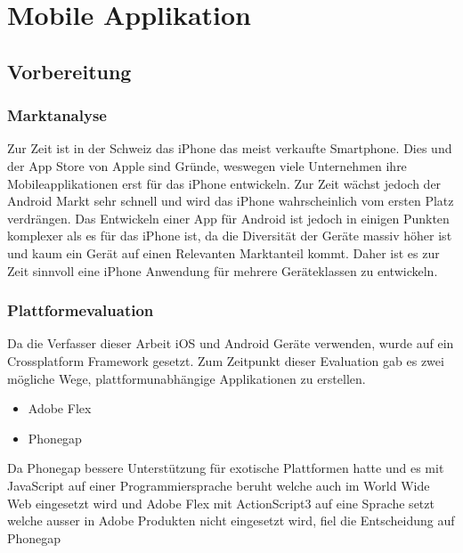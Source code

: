 
\newpage
\section{Mobile Applikation} %
\label{sec:Mobile Applikation}

\subsection{Vorbereitung} %
\label{sub:Vorbereitung}
\subsubsection{Marktanalyse} %
\label{ssub:Marktanalyse}
Zur Zeit ist in der Schweiz das iPhone das meist verkaufte Smartphone. Dies und der App Store von Apple sind Gründe, weswegen viele Unternehmen ihre Mobileapplikationen erst für das iPhone entwickeln. Zur Zeit wächst jedoch der Android Markt sehr schnell und wird das iPhone wahrscheinlich vom ersten Platz verdrängen. Das Entwickeln einer App für Android ist jedoch in einigen Punkten komplexer als es für das iPhone ist, da die Diversität der Geräte massiv höher ist und kaum ein Gerät auf einen Relevanten Marktanteil kommt. Daher ist es zur Zeit sinnvoll eine iPhone Anwendung für mehrere Geräteklassen zu entwickeln.

\subsubsection{Plattformevaluation} %
\label{ssub:Plattformevaluation}
Da die Verfasser dieser Arbeit iOS und Android Geräte verwenden, wurde auf ein Crossplatform Framework gesetzt. Zum Zeitpunkt dieser Evaluation gab es zwei mögliche Wege, plattformunabhängige Applikationen zu erstellen.
\begin{itemize}
    \item Adobe Flex
    \item Phonegap
\end{itemize}
Da Phonegap bessere Unterstützung für exotische Plattformen hatte und es mit JavaScript auf einer Programmiersprache beruht welche auch im World Wide Web eingesetzt wird und Adobe Flex mit ActionScript3 auf eine Sprache setzt welche ausser in Adobe Produkten nicht eingesetzt wird, fiel die Entscheidung auf Phonegap

